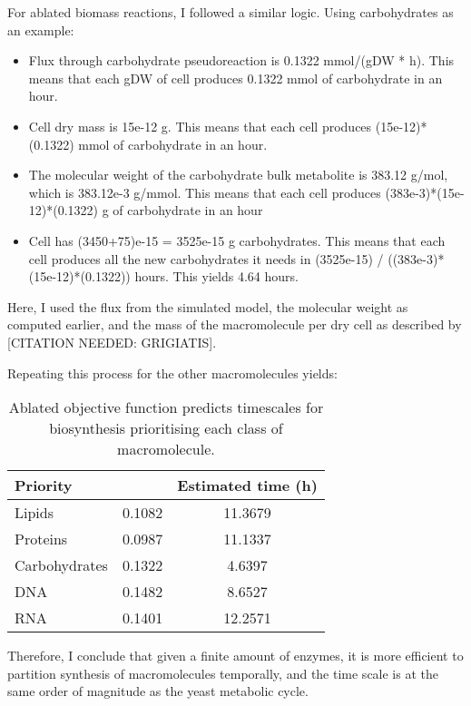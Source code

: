 For ablated biomass reactions, I followed a similar logic.
Using carbohydrates as an example:
\begin{itemize}
    \item Flux through carbohydrate pseudoreaction is 0.1322 mmol/(gDW * h).  This means that each gDW of cell produces 0.1322 mmol of carbohydrate in an hour.
    \item Cell dry mass is 15e-12 g.  This means that each cell produces (15e-12)*(0.1322) mmol of carbohydrate in an hour.
    \item The molecular weight of the carbohydrate bulk metabolite is 383.12 g/mol, which is 383.12e-3 g/mmol.  This means that each cell produces (383e-3)*(15e-12)*(0.1322) g of carbohydrate in an hour
    \item Cell has (3450+75)e-15 = 3525e-15 g carbohydrates.  This means that each cell produces all the new carbohydrates it needs in (3525e-15) / ((383e-3)*(15e-12)*(0.1322)) hours.  This yields 4.64 hours.
\end{itemize}

Here, I used the flux from the simulated model, the molecular weight as computed earlier, and the mass of the macromolecule per dry cell as described by [CITATION NEEDED: GRIGIATIS].

Repeating this process for the other macromolecules yields:

\begin{table}[ht]
  \centering
  \begin{tabular}{lSS}
    Priority & {} & {Estimated time (h)} \\
    \hline
    Lipids & 0.1082 & 11.3679 \\
    Proteins & 0.0987 & 11.1337 \\
    Carbohydrates & 0.1322 & 4.6397 \\
    DNA & 0.1482 & 8.6527 \\
    RNA & 0.1401 & 12.2571
  \end{tabular}
  \caption{Ablated objective function predicts timescales for biosynthesis prioritising each class of macromolecule.}
  \label{tab:ecyeast8-ablated-timescales}
\end{table}

Therefore, I conclude that given a finite amount of enzymes, it is more efficient to partition synthesis of macromolecules temporally, and the time scale is at the same order of magnitude as the yeast metabolic cycle.


